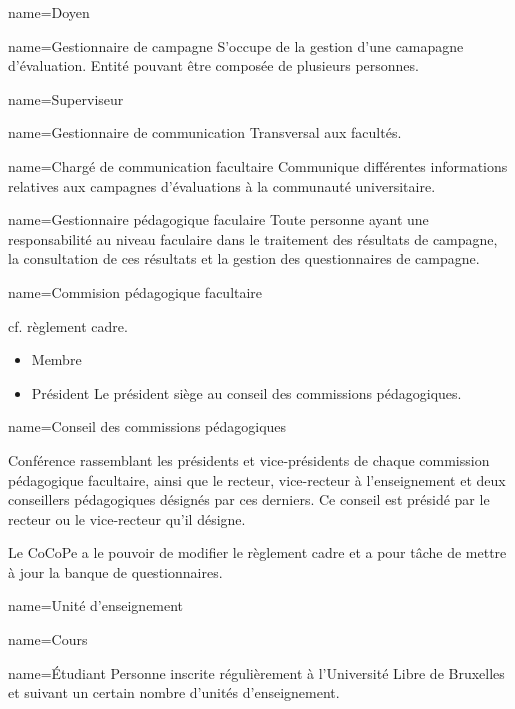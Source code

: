 	{name=Doyen}
	{}

	{name=Gestionnaire de campagne}
	{S'occupe de la gestion d'une camapagne d'évaluation. Entité pouvant être composée de plusieurs personnes.}

	{name=Superviseur}
	{}

	{name=Gestionnaire de communication}
	{Transversal aux facultés.}

	{name=Chargé de communication facultaire}
	{Communique différentes informations relatives aux campagnes d'évaluations à la communauté universitaire.}

	{name=Gestionnaire pédagogique faculaire}
	{Toute personne ayant une responsabilité au niveau faculaire dans le traitement des résultats de campagne, la consultation de ces résultats et la gestion des questionnaires de campagne.}

	{name=Commision pédagogique facultaire}
	{cf. règlement cadre.
	\begin{itemize}
		\item Membre
		\item Président
		Le président siège au conseil des commissions pédagogiques.
	\end{itemize}
	}


	{name=Conseil des commissions pédagogiques}
	{Conférence rassemblant les présidents et vice-présidents de chaque commission pédagogique facultaire, ainsi que le recteur, vice-recteur à l'enseignement et deux conseillers pédagogiques désignés par ces derniers.
	Ce conseil est présidé par le recteur ou le vice-recteur qu'il désigne.

	Le CoCoPe a le pouvoir de modifier le règlement cadre et a pour tâche de mettre à jour la banque de questionnaires.}



	{name=Unité d'enseignement}
	{}

	{name=Cours}
	{}

	{name=Étudiant}
	{Personne inscrite régulièrement à l'Université Libre de Bruxelles et suivant un certain nombre d'unités d'enseignement.}

